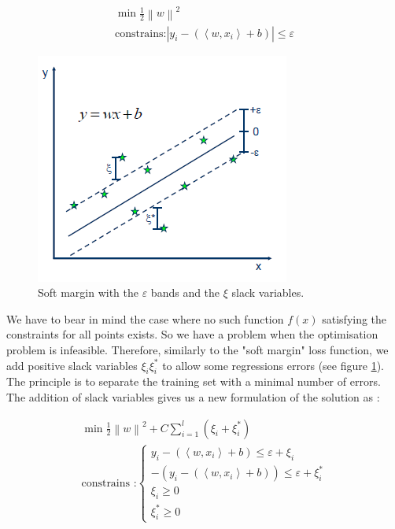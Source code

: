 \documentclass[11pt,a4paper,oneside]{book}
\begin{document}
\begin{equation}
\begin{matrix}
\min \frac{1}{2} \left \| w \right \|^{2}\\
\text{constrains:}
 \left |  y_{i} - (\left \langle w, x_{i} \right \rangle + b) \right | \leq \varepsilon 
 \end{matrix}
\end{equation}


\begin{figure}[!h]
  \centering
    \includegraphics[scale=1]{img/SVR_2.png}
  \caption{Soft margin with the $\varepsilon$ bands and the $\xi$ slack variables. \cite{Sayad}}
  \label{fig:svr}
\end{figure}

We have to bear in mind the case where no such function $f\left ( x \right )$ satisfying the constraints for all points exists. So we have a problem when the optimisation problem is infeasible. Therefore, similarly to the "soft margin" loss function, we add positive slack variables $\xi_{i}\xi_{i}^{*}$ to allow some regressions errors (see figure \ref{fig:svr}). The principle is to separate the training set with a minimal number of errors. The addition of slack variables gives us a new formulation of the solution as :

\begin{equation}
\begin{matrix}
\min \frac{1}{2} \left \| w \right \|^{2} + C\sum_{i=1}^{l}(\xi_{i}+\xi_{i}^*)\\
\text{constrains :}
\left\{\begin{matrix}
y_{i} - (\left \langle w, x_{i} \right \rangle + b)\leq \varepsilon + \xi_{i}\\ 
-(y_{i} - (\left \langle w, x_{i} \right \rangle + b))\leq \varepsilon + \xi_{i}^*\\ 
\xi_{i} \geq 0\\ 
\xi_{i}^*\geq 0
\end{matrix}\right. 
\end{matrix}
\end{equation}
\end{document}
